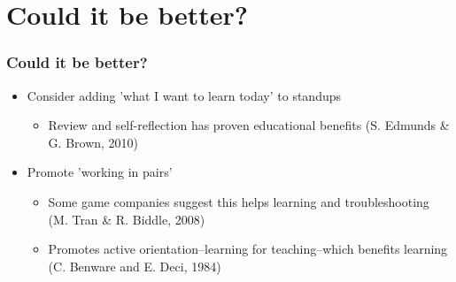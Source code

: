 \documentclass{beamer}
\begin{document}
\section{Could it be better?}
\begin{frame}
	\frametitle{Could it be better?}
	\begin{itemize}
		\item Consider adding 'what I want to learn today' to standups
		\begin{itemize}
			\item Review and self-reflection has proven educational benefits (S. Edmunds \& G. Brown, 2010)
		\end{itemize}
		\item Promote 'working in pairs'
		\begin{itemize}
			\item Some game companies suggest this helps learning and troubleshooting (M. Tran \& R. Biddle, 2008)
			\item Promotes active orientation--learning for teaching--which benefits learning (C. Benware and E. Deci, 1984)
		\end{itemize}
	\end{itemize}
\end{frame}








\nocite{*}


\end{document}
